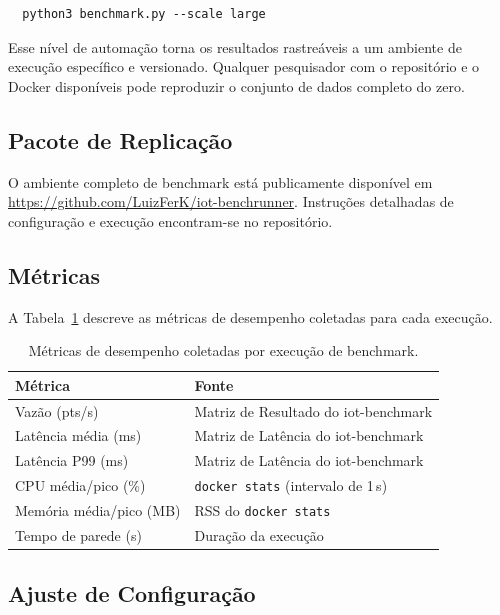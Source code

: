 \begin{verbatim}
  python3 benchmark.py --scale large
\end{verbatim}

Esse nível de automação torna os resultados rastreáveis a um ambiente de execução específico e
versionado. Qualquer pesquisador com o repositório e o Docker disponíveis pode reproduzir o
conjunto de dados completo do zero.

\subsection{Pacote de Replicação}
\label{sec:replication-pt}

O ambiente completo de benchmark está publicamente disponível em
\url{https://github.com/LuizFerK/iot-benchrunner}. Instruções detalhadas
de configuração e execução encontram-se no repositório.

\subsection{Métricas}
\label{sec:metrics}

A Tabela~\ref{tab:metrics} descreve as métricas de desempenho coletadas para cada execução.

\begin{table}[t]
  \centering
  \caption{Métricas de desempenho coletadas por execução de benchmark.}
  \label{tab:metrics}
  \begin{tabular}{ll}
    \hline
    \textbf{Métrica} & \textbf{Fonte} \\
    \hline
    Vazão (pts/s)            & Matriz de Resultado do iot-benchmark \\
    Latência média (ms)      & Matriz de Latência do iot-benchmark \\
    Latência P99 (ms)        & Matriz de Latência do iot-benchmark \\
    CPU média/pico (\%)      & \texttt{docker stats} (intervalo de 1\,s) \\
    Memória média/pico (MB)  & RSS do \texttt{docker stats} \\
    Tempo de parede (s)      & Duração da execução \\
    \hline
  \end{tabular}
\end{table}

\subsection{Ajuste de Configuração}
\label{sec:tuning}

